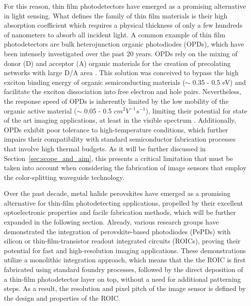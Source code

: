 For this reason, thin film photodetectors have emerged as a promising alternative in light sensing.  What defines the family of thin film materials is their high absorption coefficient which requires a physical thickness of only a few hundreds of nanometers to absorb all incident light. A common example of thin film photodetectors are bulk heterojunction organic photodiodes (OPDs), which have been intensely investigated over the past 20 years. OPDs rely on the mixing of donor (D) and acceptor (A) organic materials for the creation of precolating networks with large D/A area \cite{Scharber2013EfficiencyCells}. This solution was conceived to bypass the high exciton binding energy of organic semiconducting materials ($\sim$ 0.35 - 0.5 eV) and facilitate the exciton dissociation into free electron and hole pairs. Nevertheless, the response speed of OPDs is inherently limited by the low mobility of the organic active material ($\sim$ 0.05 - 0.5 $cm^2V^{-1}s^{-1}$), limiting their potential for state of the art imaging applications, at least in the visible spectrum \cite{Nishimura2018AnCanceller}. Additionally, OPDs exhibit poor tolerance to high-temperature conditions, which further impairs their compatibility with standard semiconductor fabrication processes that involve high thermal budgets. As it will be further discussed in Section~\ref{sec:scope_and_aim}, this presents a critical limitation that must be taken into account when considering the fabrication of image sensors that employ the color-splitting waveguide technology. 


Over the past decade, metal halide perovskites have emerged as a promising alternative for thin-film photodetecting applications, propelled by their excellent optoelectronic properties and facile fabrication methods, which will be further expanded in the following section. Already, various research groups have demonstrated the integration of perovskite-based photodiodes (PePDs) with silicon \cite{Song2024HalideImager, Wang2024ASensor, Yen2016ALayer} or thin-film-transistor \cite{Deumel2021High-sensitivityPerovskites,vanBreemen2021APerovskites} readout integrated circuits (ROICs), proving their potential for fast and high-resolution imaging applications. These demonstrations utilize a monolithic integration approach, which means that the the ROIC is first fabricated using standard foundry processes, followed by the direct deposition of a thin-film photodetector layer on top, without a need for additional patterning steps. As a result, the resolution and pixel pitch of the image sensor is defined by the design  and properties of the ROIC. 



